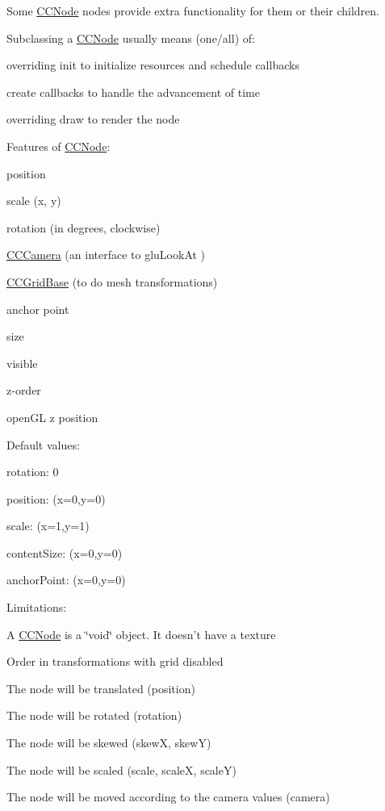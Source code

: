 Some \hyperlink{class_c_c_node}{C\-C\-Node} nodes provide extra functionality for them or their children.

Subclassing a \hyperlink{class_c_c_node}{C\-C\-Node} usually means (one/all) of\-:
\begin{DoxyItemize}
\item overriding init to initialize resources and schedule callbacks
\item create callbacks to handle the advancement of time
\item overriding draw to render the node
\end{DoxyItemize}

Features of \hyperlink{class_c_c_node}{C\-C\-Node}\-:
\begin{DoxyItemize}
\item position
\item scale (x, y)
\item rotation (in degrees, clockwise)
\item \hyperlink{interface_c_c_camera}{C\-C\-Camera} (an interface to glu\-Look\-At )
\item \hyperlink{interface_c_c_grid_base}{C\-C\-Grid\-Base} (to do mesh transformations)
\item anchor point
\item size
\item visible
\item z-\/order
\item open\-G\-L z position
\end{DoxyItemize}

Default values\-:
\begin{DoxyItemize}
\item rotation\-: 0
\item position\-: (x=0,y=0)
\item scale\-: (x=1,y=1)
\item content\-Size\-: (x=0,y=0)
\item anchor\-Point\-: (x=0,y=0)
\end{DoxyItemize}

Limitations\-:
\begin{DoxyItemize}
\item A \hyperlink{class_c_c_node}{C\-C\-Node} is a \char`\"{}void\char`\"{} object. It doesn't have a texture
\end{DoxyItemize}

Order in transformations with grid disabled
\begin{DoxyEnumerate}
\item The node will be translated (position)
\item The node will be rotated (rotation)
\item The node will be skewed (skew\-X, skew\-Y)
\item The node will be scaled (scale, scale\-X, scale\-Y)
\item The node will be moved according to the camera values (camera)
\end{DoxyEnumerate}

